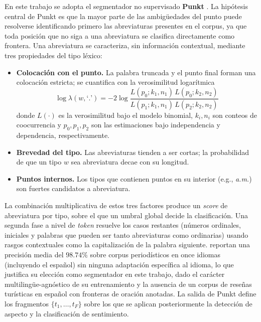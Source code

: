 En este trabajo se adopta el segmentador no supervisado \textbf{Punkt} \citep{kiss_unsupervised_2006}. La hipótesis central de Punkt es que la mayor parte de las ambigüedades del punto puede resolverse identificando primero las abreviaturas presentes en el corpus, ya que toda posición que no siga a una abreviatura se clasifica directamente como frontera. Una abreviatura se caracteriza, sin información contextual, mediante tres propiedades del tipo léxico:
\begin{itemize}
	\item \textbf{Colocación con el punto.} La palabra truncada y el punto final forman una colocación estricta; se cuantifica con la verosimilitud logarítmica
	      \begin{equation} \label{eq:punkt_llr}
		      \log\lambda(w, \texttt{`.'}) = -2 \log \frac{L(p_0; k_1, n_1)\, L(p_0; k_2, n_2)}{L(p_1; k_1, n_1)\, L(p_2; k_2, n_2)}
	      \end{equation}
	      donde $L(\cdot)$ es la verosimilitud bajo el modelo binomial, $k_i, n_i$ son conteos de coocurrencia y $p_0, p_1, p_2$ son las estimaciones bajo independencia y dependencia, respectivamente.
	\item \textbf{Brevedad del tipo.} Las abreviaturas tienden a ser cortas; la probabilidad de que un tipo $w$ sea abreviatura decae con su longitud.
	\item \textbf{Puntos internos.} Los tipos que contienen puntos en su interior (e.g., \textit{a.m.}) son fuertes candidatos a abreviatura.
\end{itemize}
La combinación multiplicativa de estos tres factores produce un \textit{score} de abreviatura por tipo, sobre el que un umbral global decide la clasificación. Una segunda fase a nivel de \textit{token} resuelve los casos restantes (números ordinales, iniciales y palabras que pueden ser tanto abreviaturas como ordinarias) usando rasgos contextuales como la capitalización de la palabra siguiente. \citet{kiss_unsupervised_2006} reportan una precisión media del $98.74\%$ sobre corpus periodísticos en once idiomas (incluyendo el español) sin ninguna adaptación específica al idioma, lo que justifica su elección como segmentador en este trabajo, dado el carácter multilingüe-agnóstico de su entrenamiento y la ausencia de un corpus de reseñas turísticas en español con fronteras de oración anotadas. La salida de Punkt define los fragmentos $\{t_1, \ldots, t_F\}$ sobre los que se aplican posteriormente la detección de aspecto y la clasificación de sentimiento.

